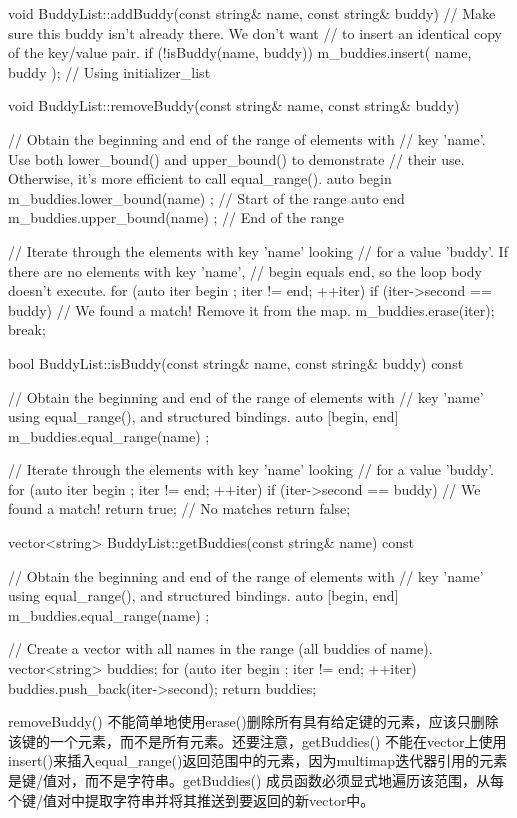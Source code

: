 \begin{cpp}
void BuddyList::addBuddy(const string& name, const string& buddy)
{
    // Make sure this buddy isn't already there. We don't want
    // to insert an identical copy of the key/value pair.
    if (!isBuddy(name, buddy)) {
        m_buddies.insert({ name, buddy }); // Using initializer_list
    }
}

void BuddyList::removeBuddy(const string& name, const string& buddy)
{
    // Obtain the beginning and end of the range of elements with
    // key 'name'. Use both lower_bound() and upper_bound() to demonstrate
    // their use. Otherwise, it's more efficient to call equal_range().
    auto begin { m_buddies.lower_bound(name) }; // Start of the range
    auto end { m_buddies.upper_bound(name) }; // End of the range

    // Iterate through the elements with key 'name' looking
    // for a value 'buddy'. If there are no elements with key 'name',
    // begin equals end, so the loop body doesn't execute.
    for (auto iter { begin }; iter != end; ++iter) {
        if (iter->second == buddy) {
            // We found a match! Remove it from the map.
            m_buddies.erase(iter);
            break;
        }
    }
}

bool BuddyList::isBuddy(const string& name, const string& buddy) const
{
    // Obtain the beginning and end of the range of elements with
    // key 'name' using equal_range(), and structured bindings.
    auto [begin, end] { m_buddies.equal_range(name) };

    // Iterate through the elements with key 'name' looking
    // for a value 'buddy'.
    for (auto iter { begin }; iter != end; ++iter) {
        if (iter->second == buddy) {
            // We found a match!
            return true;
        }
    }
    // No matches
    return false;
}

vector<string> BuddyList::getBuddies(const string& name) const
{
    // Obtain the beginning and end of the range of elements with
    // key 'name' using equal_range(), and structured bindings.
    auto [begin, end] { m_buddies.equal_range(name) };

    // Create a vector with all names in the range (all buddies of name).
    vector<string> buddies;
    for (auto iter { begin }; iter != end; ++iter) {
        buddies.push_back(iter->second);
    }
    return buddies;
}
\end{cpp}

removeBuddy() 不能简单地使用erase()删除所有具有给定键的元素，应该只删除该键的一个元素，而不是所有元素。还要注意，getBuddies() 不能在vector上使用insert()来插入equal\_range()返回范围中的元素，因为multimap迭代器引用的元素是键/值对，而不是字符串。getBuddies() 成员函数必须显式地遍历该范围，从每个键/值对中提取字符串并将其推送到要返回的新vector中。

